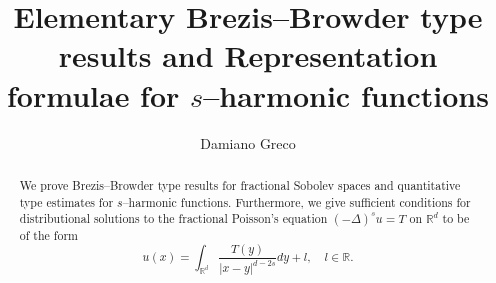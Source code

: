 \documentclass[letterpaper, 11pt,  reqno]{amsart}
\theoremstyle{definition}
\theoremstyle{remark}
\numberwithin{equation}{section}
\newcommand{\R}{{\mathbb R}}
\begin{document}
\title[Brezis Browder results and $s$-harmonic fuctions]{Elementary Brezis--Browder type results and Representation formulae for $s$--harmonic functions}

\author{Damiano Greco}
\address{Damiano Greco\\School of Mathematics\\
The University of Edinburgh\\
and The Maxwell Institute for the Mathematical Sciences\\
James Clerk Maxwell Building\\
The King's Buildings\\
Peter Guthrie Tait Road\\
Edinburgh\\ 
EH9 3FD\\
 United Kingdom}



\date{}

\begin{abstract}
\noindent We prove Brezis--Browder type results for fractional Sobolev spaces and quantitative type estimates for $s$--harmonic functions.
Furthermore, we give sufficient conditions 
for distributional solutions to the fractional Poisson's equation $(-\Delta)^su=T$ on $\R^d$ to be of the form
$$u(x)=\int_{\R^d}\frac{T(y)}{|x-y|^{d-2s}}dy+l,\quad l\in \R.$$
\end{abstract}

\maketitle
\end{document}
